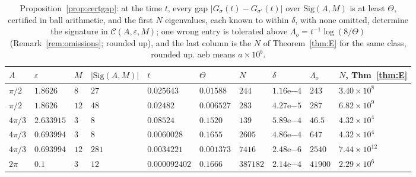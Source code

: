 \documentclass[pdflatex,sn-mathphys-num]{sn-jnl}
\theoremstyle{thmstyleone}%
\theoremstyle{thmstylethree}%
\newcommand{\Cl}{\mathcal{C}}
\newcommand{\Sig}{\mathrm{Sig}}
\begin{document}
\begin{table}[t]
\centering\footnotesize
\caption{Proposition~\ref{prop:certgap}: at the time $t$, every gap $|G_\sigma(t)-G_{\sigma'}(t)|$ over $\Sig(A,M)$ is at least $\Theta$, certified in ball arithmetic, and the first $N$ eigenvalues, each known to within $\delta$, with none omitted, determine the signature in $\Cl(A,\varepsilon,M)$; one wrong entry is tolerated above $\Lambda_o=t^{-1}\log(8/\Theta)$ (Remark~\ref{rem:omissions}; rounded up), and the last column is the $N$ of Theorem~\ref{thm:E} for the same class, rounded up. aeb means $a\times10^b$.}\label{tab:certgap}
\setlength{\tabcolsep}{3.5pt}\begin{tabular}{@{}llllllllll@{}}
\toprule
$A$ & $\varepsilon$ & $M$ & $|\Sig(A,M)|$ & $t$ & $\Theta$ & $N$ & $\delta$ & $\Lambda_o$ & $N$, Thm~\ref{thm:E}\\
\midrule
$\pi/2$ & $1.8626$ & $8$ & $27$ & $0.025643$ & $0.01588$ & $244$ & $1.16$e$-4$ & $243$ & $3.40\times10^{8}$\\
$\pi/2$ & $1.8626$ & $12$ & $48$ & $0.02482$ & $0.006527$ & $283$ & $4.27$e$-5$ & $287$ & $6.82\times10^{9}$\\
$4\pi/3$ & $2.633915$ & $3$ & $8$ & $0.08524$ & $0.1520$ & $139$ & $5.89$e$-4$ & $46.5$ & $4.32\times10^{4}$\\
$4\pi/3$ & $0.693994$ & $3$ & $8$ & $0.0060028$ & $0.1655$ & $2605$ & $4.86$e$-4$ & $647$ & $4.32\times10^{4}$\\
$4\pi/3$ & $0.693994$ & $12$ & $281$ & $0.0034221$ & $0.001373$ & $7416$ & $2.48$e$-6$ & $2540$ & $7.44\times10^{12}$\\
$2\pi$ & $0.1$ & $3$ & $12$ & $0.000092402$ & $0.1666$ & $387182$ & $2.14$e$-4$ & $41900$ & $2.29\times10^{6}$\\
\bottomrule
\end{tabular}
\end{table}
\end{document}
